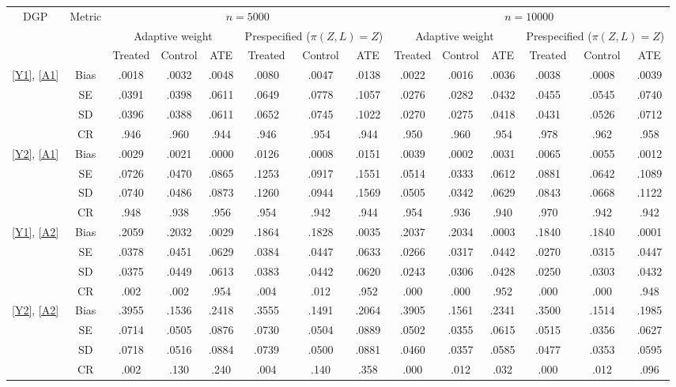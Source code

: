 \begin{tabular}{cc| ccc |ccc |ccc |ccc}
\toprule
\multirow{3}{*}{DGP}&\multirow{3}{*}{Metric}&
\multicolumn{6}{c}{$n=5000$}&\multicolumn{6}{|c}{$n=10000$}\\
\cmidrule(lr){3-8}\cmidrule(lr){9-14}
&&\multicolumn{3}{c}{Adaptive weight}&\multicolumn{3}{|c}{Prespecified ($\pi(Z,L)=Z$)}&
\multicolumn{3}{|c}{Adaptive weight}&\multicolumn{3}{|c}{Prespecified ($\pi(Z,L)=Z$)}\\
&& Treated & Control & ATE & Treated & Control & ATE & Treated & Control & ATE & Treated & Control & ATE\\
\midrule
\multirow{4}{*}{\ref{Y1}, \ref{A1}}
&Bias &.0018 &.0032 &.0048 &.0080 &.0047 &.0138 &.0022 &.0016 &.0036 &.0038 &.0008 &.0039 \\
&SE &.0391 &.0398 &.0611 &.0649 &.0778 &.1057 &.0276 &.0282 &.0432 &.0455 &.0545 &.0740 \\
&SD &.0396 &.0388 &.0611 &.0652 &.0745 &.1022 &.0270 &.0275 &.0418 &.0431 &.0526 &.0712 \\
&CR &.946 &.960 &.944 &.946 &.954 &.944 &.950 &.960 &.954 &.978 &.962 &.958 \\
[5pt]
\multirow{4}{*}{\ref{Y2}, \ref{A1}}
&Bias &.0029 &.0021 &.0000 &.0126 &.0008 &.0151 &.0039 &.0002 &.0031 &.0065 &.0055 &.0012 \\
&SE &.0726 &.0470 &.0865 &.1253 &.0917 &.1551 &.0514 &.0333 &.0612 &.0881 &.0642 &.1089 \\
&SD &.0740 &.0486 &.0873 &.1260 &.0944 &.1569 &.0505 &.0342 &.0629 &.0843 &.0668 &.1122 \\
&CR &.948 &.938 &.956 &.954 &.942 &.944 &.954 &.936 &.940 &.970 &.942 &.942 \\
[5pt]
\multirow{4}{*}{\ref{Y1}, \ref{A2}}
&Bias &.2059 &.2032 &.0029 &.1864 &.1828 &.0035 &.2037 &.2034 &.0003 &.1840 &.1840 &.0001 \\
&SE &.0378 &.0451 &.0629 &.0384 &.0447 &.0633 &.0266 &.0317 &.0442 &.0270 &.0315 &.0447 \\
&SD &.0375 &.0449 &.0613 &.0383 &.0442 &.0620 &.0243 &.0306 &.0428 &.0250 &.0303 &.0432 \\
&CR &.002 &.002 &.954 &.004 &.012 &.952 &.000 &.000 &.952 &.000 &.000 &.948 \\
[5pt]
\multirow{4}{*}{\ref{Y2}, \ref{A2}}
&Bias &.3955 &.1536 &.2418 &.3555 &.1491 &.2064 &.3905 &.1561 &.2341 &.3500 &.1514 &.1985 \\
&SE &.0714 &.0505 &.0876 &.0730 &.0504 &.0889 &.0502 &.0355 &.0615 &.0515 &.0356 &.0627 \\
&SD &.0718 &.0516 &.0884 &.0739 &.0500 &.0881 &.0460 &.0357 &.0585 &.0477 &.0353 &.0595 \\
&CR &.002 &.130 &.240 &.004 &.140 &.358 &.000 &.012 &.032 &.000 &.012 &.096 \\
\bottomrule
\end{tabular}
